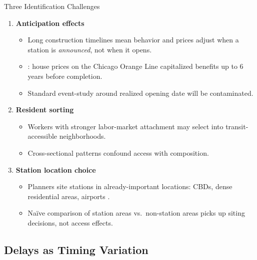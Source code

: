 \documentclass{beamer}
\begin{document}
\begin{frame}{Three Identification Challenges}
\small
\begin{enumerate}
    \item \textbf{Anticipation effects}
    \begin{itemize}
        \item Long construction timelines mean behavior and prices adjust when a station is
              \emph{announced}, not when it opens.
        \item \textcite{mcmillen_reaction_2004}: house prices on the Chicago Orange Line
              capitalized benefits up to 6 years before completion.
        \item Standard event-study around realized opening date will be contaminated.
    \end{itemize}
    \medskip
    \item \textbf{Resident sorting}
    \begin{itemize}
        \item Workers with stronger labor-market attachment may select into transit-accessible
              neighborhoods.
        \item Cross-sectional patterns confound access with composition.
    \end{itemize}
    \medskip
    \item \textbf{Station location choice}
    \begin{itemize}
        \item Planners site stations in already-important locations: CBDs, dense residential
              areas, airports \parencite{tyndall_airports}.
        \item Naïve comparison of station areas vs.\ non-station areas picks up siting
              decisions, not access effects.
    \end{itemize}
\end{enumerate}
\end{frame}

\subsection{Delays as Timing Variation}
\end{document}
